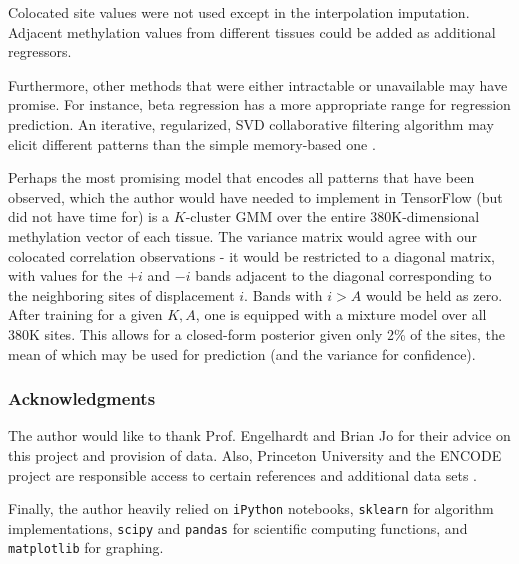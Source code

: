 \documentclass{article} %
\begin{document}
Colocated site values were not used except in the interpolation imputation. Adjacent methylation values from different tissues could be added as additional regressors.

Furthermore, other methods that were either intractable or unavailable may have promise. For instance, beta regression has a more appropriate range for regression prediction. An iterative, regularized, SVD collaborative filtering algorithm may elicit different patterns than the simple memory-based one \cite{percy}.

Perhaps the most promising model that encodes all patterns that have been observed, which the author would have needed to implement in TensorFlow (but did not have time for) is a $K$-cluster GMM over the entire 380K-dimensional methylation vector of each tissue. The variance matrix would agree with our colocated correlation observations - it would be restricted to a diagonal matrix, with values for the $+i$ and $-i$ bands adjacent to the diagonal corresponding to the neighboring sites of displacement $i$. Bands with $i> A$ would be held as zero. After training for a given $K,A$, one is equipped with a mixture model over all 380K sites. This allows for a closed-form posterior given only 2\% of the sites, the mean of which may be used for prediction (and the variance for confidence).


\subsubsection*{Acknowledgments}

The author would like to thank Prof. Engelhardt and Brian Jo for their advice on this project and provision of data. Also, Princeton University and the ENCODE project are responsible access to certain references and additional data sets \cite{encode2004encode}.

Finally, the author heavily relied on \texttt{iPython} \cite{iPython} notebooks, \texttt{sklearn} \cite{scikit-learn} for algorithm implementations, \texttt{scipy} \cite{scipy} and \texttt{pandas} \cite{pandas} for scientific computing functions, and \texttt{matplotlib} \cite{matplotlib} for graphing.

\pagebreak


\end{document}
